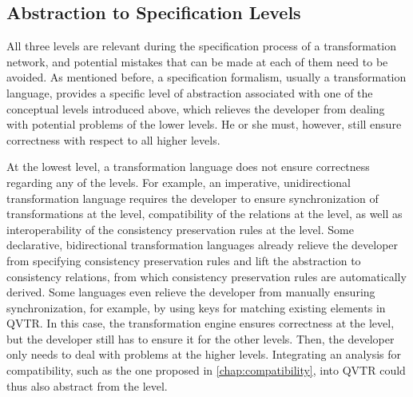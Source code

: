 \subsection{Abstraction to Specification Levels}

All three levels are relevant during the specification process of a transformation network, and potential mistakes that can be made at each of them need to be avoided.
As mentioned before, a specification formalism, usually a transformation language, provides a specific level of abstraction associated with one of the conceptual levels introduced above, which relieves the developer from dealing with potential problems of the lower levels.
He or she must, however, still ensure correctness with respect to all higher levels.

At the lowest level, a transformation language does not ensure correctness regarding any of the levels.
For example, an imperative, unidirectional transformation language requires the developer to ensure synchronization of transformations at the \leveltransformation level, compatibility of the relations at the \levelnetworkrelation level, as well as interoperability of the consistency preservation rules at the \levelnetworkrule level.
Some declarative, bidirectional transformation languages already relieve the developer from specifying consistency preservation rules and lift the abstraction to consistency relations, from which consistency preservation rules are automatically derived.
Some languages even relieve the developer from manually ensuring synchronization, for example, by using keys for matching existing elements in \gls{QVTR}.
In this case, the transformation engine ensures correctness at the \leveltransformation level, but the developer still has to ensure it for the other levels.
Then, the developer only needs to deal with problems at the higher levels.
Integrating an analysis for compatibility, such as the one proposed in \autoref{chap:compatibility}, into \gls{QVTR} could thus also abstract from the \levelnetworkrelation level.


